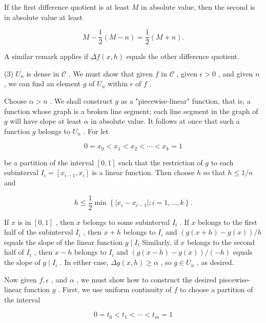 If the first difference quotient is at least \(M\) in absolute value, then the second is in absolute value at least

\[
M - \frac{1}{2}\left( {M - n}\right)  = \frac{1}{2}\left( {M + n}\right) .
\]

A similar remark applies if \({\Delta f}\left( {x,h}\right)\) equals the other difference quotient.

(3) \({U}_{n}\) is dense in \(\mathcal{C}\) . We must show that given \(f\) in \(\mathcal{C}\) , given \(\epsilon  > 0\) , and given \(n\) , we can find an element \(g\) of \({U}_{n}\) within \(\epsilon\) of \(f\) .

Choose \(\alpha  > n\) . We shall construct \(g\) as a "piecewise-linear" function, that is, a function whose graph is a broken line segment; each line segment in the graph of \(g\) will have slope at least \(\alpha\) in absolute value. It follows at once that such a function \(g\) belongs to \({U}_{n}\) . For let

\[
0 = {x}_{0} < {x}_{1} < {x}_{2} < \cdots  < {x}_{k} = 1
\]

be a partition of the interval \(\left\lbrack  {0,1}\right\rbrack\) such that the restriction of \(g\) to each subinterval \({I}_{i} = \left\lbrack  {{x}_{i - 1},{x}_{i}}\right\rbrack\) is a linear function. Then choose \(h\) so that \(h \leq  1/n\) and

\[
h \leq  \frac{1}{2}\min \left\{  {\left| {{x}_{i} - {x}_{i - 1}}\right| ;i = 1,\ldots ,k}\right\}  .
\]

If \(x\) is in \(\left\lbrack  {0,1}\right\rbrack\) , then \(x\) belongs to some subinterval \({I}_{i}\) . If \(x\) belongs to the first half of the subinterval \({I}_{i}\) , then \(x + h\) belongs to \({I}_{i}\) and \(\left( {g\left( {x + h}\right)  - g\left( x\right) }\right) /h\) equals the slope of the linear function \(g \mid  {I}_{i}\) Similarly, if \(x\) belongs to the second half of \({I}_{i}\) , then \(x - h\) belongs to \({I}_{i}\) and \(\left( {g\left( {x - h}\right)  - g\left( x\right) }\right) /\left( {-h}\right)\) equals the slope of \(g \mid  {I}_{i}\) . In either case, \({\Delta g}\left( {x,h}\right)  \geq  \alpha\) , so \(g \in  {U}_{n}\) , as desired.

Now given \(f,\epsilon\) , and \(\alpha\) , we must show how to construct the desired piecewise-linear function \(g\) . First, we use uniform continuity of \(f\) to choose a partition of the interval

\[
0 = {t}_{0} < {t}_{1} < \cdots  < {t}_{m} = 1
\]

